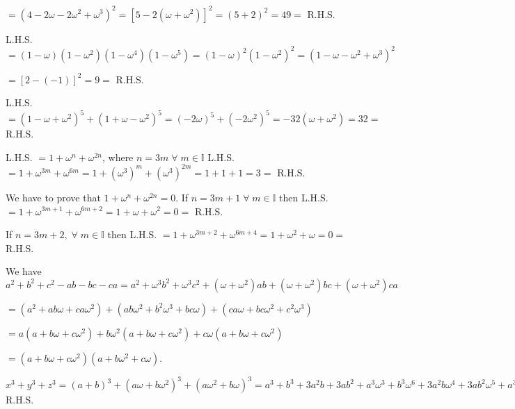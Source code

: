     $= (4 - 2\omega - 2\omega^2 + \omega^3)^2 = [5 - 2(\omega + \omega^2)]^2 = (5 + 2)^2 = 49 =$ R.H.S.
  \item L.H.S. $= (1 - \omega)(1 - \omega^2)(1 - \omega^4)(1 - \omega^5) = (1 - \omega)^2(1 - \omega^2)^2 =
    (1 - \omega - \omega^2 + \omega^3)^2$

    $= [2 - (-1)]^2 = 9 =$ R.H.S.
  \item L.H.S. $= (1 - \omega + \omega^2)^5 + (1 + \omega - \omega^2)^5 = (-2\omega)^5 + (-2\omega^2)^5 =
    -32(\omega + \omega^2) = 32 =$ R.H.S.
  \item L.H.S. $= 1 + \omega^n + \omega^{2n}$, where $n = 3m\;\forall\;m\in \mathbb{I}$ L.H.S. $= 1 +
    \omega^{3m} + \omega^{6m} = 1 + (\omega^3)^m + (\omega^3)^{2m} = 1 + 1 + 1 = 3 =$ R.H.S.
  \item We have to prove that $1 + \omega^n + \omega^{2n} = 0$. If $n = 3m + 1\;\forall\;m\in\mathbb{I}$
    then L.H.S. $= 1 + \omega^{3m + 1} + \omega^{6m + 2} = 1 + \omega + \omega^2 = 0 =$ R.H.S.

    If $n = 3m + 2,\;\forall\;m\in\mathbb{I}$ then L.H.S. $= 1 + \omega^{3m + 2} + \omega^{6m + 4} = 1 +
    \omega^2 + \omega = 0 =$ R.H.S.
  \stopitemize
\item We have $a^2 + b^2 + c^2 - ab - bc - ca = a^2 + \omega^3b^2 + \omega^3c^2 + (\omega + \omega^2)ab +
  (\omega + \omega^2)bc + (\omega + \omega^2)ca$

  $= (a^2 + ab\omega + ca\omega^2) + (ab\omega^2 + b^2\omega^3 + bc\omega) + (ca\omega + bc\omega^2 +
  c^2\omega^3)$

  $= a(a + b\omega + c\omega^2) + b\omega^2(a + b\omega + c\omega^2) + c\omega(a + b\omega + c\omega^2)$

  $= (a + b\omega + c\omega^2)(a + b\omega^2 + c\omega)$.
\item $x^3 + y^3 + z^3 = (a + b)^3 + (a\omega + b\omega^2)^3 + (a\omega^2 + b\omega)^3 = a^3 + b^3 + 3a^2b +
  3ab^2 + a^3\omega^3 + b^3\omega^6 + 3a^2b\omega^4 + 3ab^2\omega^5 + a^3\omega^6 + b^3\omega^3 +
  3a^2b\omega^5 + 3ab^2\omega^4 = 3[a^3 + b^3 + 3a^2b(1 + \omega + \omega^2) + 3ab^2(1 + \omega + \omega^2)]
  = 3(a^3 + b^3) = $R.H.S.

